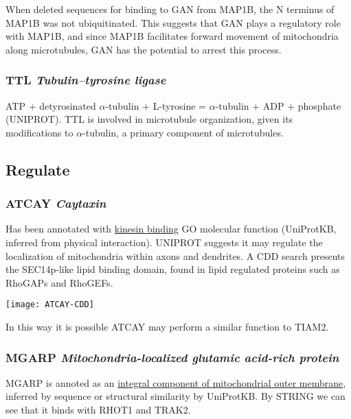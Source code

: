 When \citeauthor{Allen2005} deleted sequences for binding to GAN from MAP1B,
the N terminus of MAP1B was not ubiquitinated. This suggests that GAN plays
a regulatory role with MAP1B, and since MAP1B facilitates forward movement
of mitochondria along microtubules, GAN has the potential to arrest this
process.

\subsubsection{TTL \textit{Tubulin--tyrosine ligase}}

ATP + detyrosinated $\alpha$-tubulin + L-tyrosine = $\alpha$-tubulin + ADP +
phosphate (UNIPROT). TTL is involved in microtubule organization, given its
modifications to $\alpha$-tubulin, a primary component of microtubules.

\subsection{Regulate}

\subsubsection{ATCAY \textit{Caytaxin}}

Has been annotated with \href{http://www.ebi.ac.uk/QuickGO/GTerm?id=GO:0019894}{kinesin binding}
GO molecular function (UniProtKB, inferred from physical interaction).
UNIPROT suggests it may regulate the localization of mitochondria within
axons and dendrites. A CDD search presents the SEC14p-like lipid binding
domain, found in lipid regulated proteins such as RhoGAPs and RhoGEFs.

\begin{center}
  \texttt{[image: ATCAY-CDD]}
\end{center}

In this way it is possible ATCAY may perform a similar function to TIAM2.

\subsubsection{MGARP \textit{Mitochondria-localized glutamic acid-rich protein}}

MGARP is annoted as an
\href{http://www.ebi.ac.uk/QuickGO/GTerm?id=GO:0031307}{integral component of
mitochondrial outer membrane}, inferred by sequence or structural similarity by
UniProtKB. By STRING we can see that it binds with RHOT1 and TRAK2.

